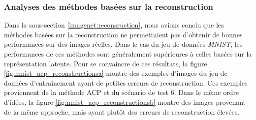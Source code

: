 \subsubsection{Analyses des méthodes basées sur la reconstruction} \label{mnist:reconsruction}

Dans la sous-section \ref{imagenet:reconsruction}, nous avions conclu que les méthodes basées sur la reconstruction ne permettaient pas d'obtenir de bonnes performances sur des images réelles. Dans le cas du jeu de données \textit{MNIST}, les performances de ces méthodes sont généralement supérieures à celles basées sur la représentation latente. Pour se convaincre de ces résultats, la figure \ref{fig:mnist_acp_reconstructionsa} montre des exemples d'images du jeu de données d'entraînement ayant de petites erreurs de reconstruction. Ces exemples proviennent de la méthode ACP et du scénario de test 6.  Dans le même ordre d'idées, la figure \ref{fig:mnist_acp_reconstructionsb} montre des images provenant de la même approche, mais ayant plutôt des erreurs de reconstruction élevées. 

